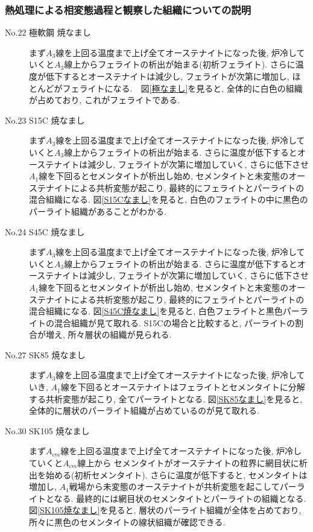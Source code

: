 \documentclass[a4paper,11pt,uplatex]{jsarticle}
\begin{document}
\subsubsection{熱処理による相変態過程と観察した組織についての説明}
\begin{description}
  \item[No.22 極軟鋼 焼なまし]
  まず$A_3$線を上回る温度まで上げ全てオーステナイトになった後, 炉冷していくと$A_3$線上からフェライトの析出が始まる(初析フェライト). さらに温度が低下するとオーステナイトは減少し,
  フェライトが次第に増加し, ほとんどがフェライトになる.　図\ref{極なまし}を見ると, 全体的に白色の組織が占めており, これがフェライトである.
  \item[No.23 S15C 焼なまし]
  まず$A_3$線を上回る温度まで上げ全てオーステナイトになった後, 炉冷していくと$A_3$線上からフェライトの析出が始まる. さらに温度が低下するとオーステナイトは減少し,
  フェライトが次第に増加していく, さらに低下させ$A_1$線を下回るとセメンタイトが析出し始め, セメンタイトと未変態のオーステナイトによる共析変態が起こり,
  最終的にフェライトとパーライトの混合組織になる.
  図\ref{S15Cなまし}を見ると, 白色のフェライトの中に黒色のパーライト組織があることがわかる.
  \item[No.24 S45C 焼なまし]
  まず$A_3$線を上回る温度まで上げ全てオーステナイトになった後, 炉冷していくと$A_3$線上からフェライトの析出が始まる. さらに温度が低下するとオーステナイトは減少し,
  フェライトが次第に増加していく, さらに低下させ$A_1$線を下回るとセメンタイトが析出し始め, セメンタイトと未変態のオーステナイトによる共析変態が起こり,
  最終的にフェライトとパーライトの混合組織になる. 図\ref{S45C焼なまし}を見ると, 白色フェライトと黒色パーライトの混合組織が見て取れる.
  S15Cの場合と比較すると, パーライトの割合が増え, 所々層状の組織が見られる.
  \item[No.27 SK85 焼なまし]
  まず$A_3$線を上回る温度まで上げ全てオーステナイトになった後, 炉冷していき, $A_1$線を下回るとオーステナイトはフェライトとセメンタイトに分解する共析変態が起こり,
  全てパーライトとなる. 図\ref{SK85なまし}を見ると, 全体的に層状のパーライト組織が占めているのが見て取れる.
  \item[No.30 SK105 焼なまし]
  まず$A_{cm}$線を上回る温度まで上げ全てオーステナイトになった後, 炉冷していくと$A_{cm}$線上から
  セメンタイトがオーステナイトの粒界に網目状に析出を始める(初析セメンタイト). さらに温度が低下すると, セメンタイトは増加し, $A_1$戦場から未変態のオーステナイトが共析変態を起こしてパーライトとなる.
  最終的には網目状のセメンタイトとパーライトの組織となる. 図\ref{SK105焼なまし}を見ると, 層状のパーライト組織が全体を占めており, 所々に黒色のセメンタイトの線状組織が確認できる.

\end{description}
\end{document}
